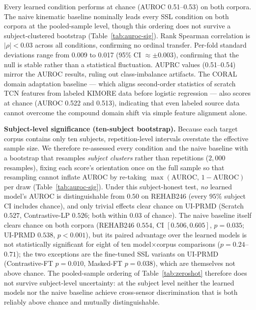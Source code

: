 \documentclass[10pt,journal]{IEEEtran}
\begin{document}
Every learned condition performs at chance (AUROC 0.51--0.53) on both corpora. The naive kinematic baseline nominally leads every SSL condition on both corpora at the pooled-sample level, though this ordering does not survive a subject-clustered bootstrap (Table~\ref{tab:auroc-sig}). Rank Spearman correlation is $|\rho| < 0.03$ across all conditions, confirming no ordinal transfer. Per-fold standard deviations range from 0.009 to 0.017 (95\% CI $\approx \pm 0.003$), confirming that the null is stable rather than a statistical fluctuation. AUPRC values (0.51--0.54) mirror the AUROC results, ruling out class-imbalance artifacts. The CORAL domain adaptation baseline --- which aligns second-order statistics of scratch TCN features from labeled KIMORE data before logistic regression --- also scores at chance (AUROC 0.522 and 0.513), indicating that even labeled source data cannot overcome the compound domain shift via simple feature alignment alone.

\textbf{Subject-level significance (ten-subject bootstrap).} Because each target corpus contains only ten subjects, repetition-level intervals overstate the effective sample size. We therefore re-assessed every condition and the naive baseline with a bootstrap that resamples \emph{subject clusters} rather than repetitions ($2{,}000$ resamples), fixing each score's orientation once on the full sample so that resampling cannot inflate AUROC by re-taking $\max(\text{AUROC},\,1-\text{AUROC})$ per draw (Table~\ref{tab:auroc-sig}). Under this subject-honest test, \emph{no} learned model's AUROC is distinguishable from $0.50$ on REHAB246 (every $95\%$ subject CI includes chance), and only trivial effects clear chance on UI-PRMD (Scratch $0.527$, Contrastive-LP $0.526$; both within $0.03$ of chance). The naive baseline itself clears chance on both corpora (REHAB246 $0.554$, CI $[0.506,0.605]$, $p=0.035$; UI-PRMD $0.538$, $p<0.001$), but its paired advantage over the learned models is not statistically significant for eight of ten model$\times$corpus comparisons ($p=0.24$--$0.71$); the two exceptions are the fine-tuned SSL variants on UI-PRMD (Contrastive-FT $p=0.010$, Masked-FT $p=0.038$), which are themselves not above chance. The pooled-sample ordering of Table~\ref{tab:zeroshot} therefore does not survive subject-level uncertainty: at the subject level neither the learned models nor the naive baseline achieve cross-sensor discrimination that is both reliably above chance and mutually distinguishable.
\end{document}
